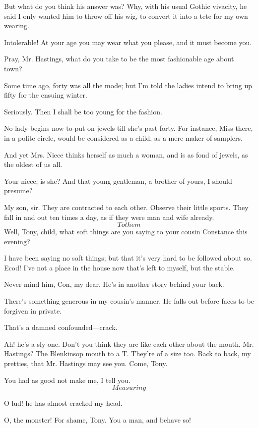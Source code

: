 \documentclass{book}
\begin{document}
\7  But what do you think his answer was?  Why, with his
usual Gothic vivacity, he said I only wanted him to throw off his wig,
to convert it into a tete for my own wearing.

\4  Intolerable!  At your age you may wear what you please, and
it must become you.

\7  Pray, Mr. Hastings, what do you take to be the most
fashionable age about town?

\4  Some time ago, forty was all the mode; but I'm told the
ladies intend to bring up fifty for the ensuing winter.

\7  Seriously.  Then I shall be too young for the
fashion.

\4  No lady begins now to put on jewels till she's past forty. 
For instance, Miss there, in a polite circle, would be considered as a
child, as a mere maker of samplers.

\7  And yet Mrs. Niece thinks herself as much a woman,
and is as fond of jewels, as the oldest of us all.

\4  Your niece, is she?  And that young gentleman, a brother of
yours, I should presume?

\7  My son, sir.  They are contracted to each other. 
Observe their little sports.  They fall in and out ten times a day, as
if they were man and wife already.  \[To them\]  Well, Tony, child, what
soft things are you saying to your cousin Constance this evening?

\5  I have been saying no soft things; but that it's very hard to be
followed about so.  Ecod! I've not a place in the house now that's left
to myself, but the stable.

\7  Never mind him, Con, my dear.  He's in another story
behind your back.

\9  There's something generous in my cousin's manner.  He
falls out before faces to be forgiven in private.

\5  That's a damned confounded---crack.

\7  Ah! he's a sly one.  Don't you think they are like
each other about the mouth, Mr. Hastings?  The Blenkinsop mouth to a T. 
They're of a size too.  Back to back, my pretties, that Mr. Hastings
may see you.  Come, Tony.

\5  You had as good not make me, I tell you. \[Measuring\]

\9  O lud! he has almost cracked my head.

\7  O, the monster!  For shame, Tony.  You a man, and behave so!
\end{document}
